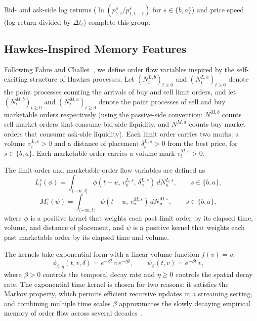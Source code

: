 \documentclass[11pt]{report}
\begin{document}
Bid- and ask-side log returns ($\ln(p^s_{1,t} / p^s_{1,t-1})$ for $s \in \{b, a\}$) and price speed (log return divided by $\Delta t_t$) complete this group.


\subsection{Hawkes-Inspired Memory Features}\label{subsec:features:hawkes}

Following Fabre and Challet~\cite{fabre_2025}, we define order flow variables inspired by the self-exciting structure of Hawkes processes. Let $(N^{L,b}_t)_{t \geq 0}$ and $(N^{L,a}_t)_{t \geq 0}$ denote the point processes counting the arrivals of buy and sell limit orders, and let $(N^{M,b}_t)_{t \geq 0}$ and $(N^{M,a}_t)_{t \geq 0}$ denote the point processes of sell and buy marketable orders respectively (using the passive-side convention: $N^{M,b}$ counts sell market orders that consume bid-side liquidity, and $N^{M,a}$ counts buy market orders that consume ask-side liquidity). Each limit order carries two marks: a volume $v^{L,s}_t > 0$ and a distance of placement $\delta^{L,s}_t > 0$ from the best price, for $s \in \{b, a\}$. Each marketable order carries a volume mark $v^{M,s}_t > 0$.

The limit-order and marketable-order flow variables are defined as
\begin{equation}
  \label{eq:limit_flow}
  L^s_t(\phi) = \int_{(-\infty,t]} \phi(t - u,\, v^{L,s}_u,\, \delta^{L,s}_u)\, dN^{L,s}_u, \qquad s \in \{b, a\},
\end{equation}
\begin{equation}
  \label{eq:market_flow}
  M^s_t(\psi) = \int_{(-\infty,t]} \psi(t - u,\, v^{M,s}_u)\, dN^{M,s}_u, \qquad s \in \{b, a\},
\end{equation}
where $\phi$ is a positive kernel that weights each past limit order by its elapsed time, volume, and distance of placement, and $\psi$ is a positive kernel that weights each past marketable order by its elapsed time and volume.

The kernels take exponential form with a linear volume function $f(v) = v$:
\begin{equation}
  \label{eq:limit_kernel}
  \phi_{\beta,\eta}(t, v, \delta) = e^{-\beta t}\, v\, e^{-\eta \delta}, \qquad
  \psi_{\beta}(t, v) = e^{-\beta t}\, v,
\end{equation}
where $\beta > 0$ controls the temporal decay rate and $\eta \geq 0$ controls the spatial decay rate. The exponential time kernel is chosen for two reasons: it satisfies the Markov property, which permits efficient recursive updates in a streaming setting, and combining multiple time scales $\beta$ approximates the slowly decaying empirical memory of order flow across several decades~\cite{fabre_2025}.
\end{document}
